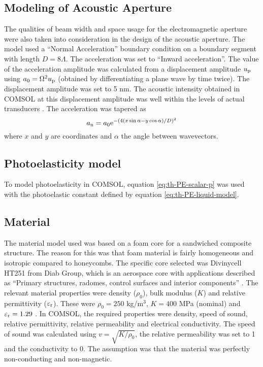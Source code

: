 \documentclass[11pt,twoside]{eitExjobb}
\begin{document}
	\subsection{Modeling of Acoustic Aperture}
	The qualities of beam width and space usage for the electromagnetic aperture were also taken into consideration in the design of the acoustic aperture. The model used a ``Normal Acceleration'' boundary condition on a boundary segment with length $D = 8\Lambda$. The acceleration was set to ``Inward acceleration''. The value of the acceleration amplitude was calculated from a displacement amplitude $u_{\mathrm{p}}$ using $a_0 = \Omega^2 u_{\mathrm{p}}$ (obtained by differentiating a plane wave by time twice). The displacement amplitude was set to 5 nm. The acoustic intensity obtained in COMSOL at this displacement amplitude was well within the levels of actual transducers \cite{Straub2008}. The acceleration was tapered as
	\begin{equation*}
		a_{\mathrm{n}} = a_0 \mathrm{e}^{-(4(x\sin{\alpha} - y\cos{\alpha})/D)^2}
	\end{equation*}
	where $x$ and $y$ are coordinates and $\alpha$ the angle between wavevectors.
	
	\subsection{Photoelasticity model}
	To model photoelasticity in COMSOL, equation \eqref{eq:th-PE-scalar-p} was used with the photoelastic constant defined by equation \eqref{eq:th-PE-liquid-model}.
	
	\subsection{Material}
	The material model used was based on a foam core for a sandwiched composite structure. The reason for this was that foam material is fairly homogeneous and isotropic compared to honeycombs. The specific core selected was Divinycell HT251 from Diab Group, which is an aerospace core with applications described as ``Primary structures, radomes, control surfaces and interior components'' \cite{Diab2016}. The relevant material properties were density ($\rho_0$), bulk modulus ($K$) and relative permittivity ($\varepsilon_{\mathrm{r}}$). These were $\rho_0 = 250$ kg/m$^3$, $K = 400$ MPa (nominal) and $\varepsilon_{\mathrm{r}} = 1.29$ \cite{Diab2016}. In COMSOL, the required properties were density, speed of sound, relative permittivity, relative permeability and electrical conductivity. The speed of sound was calculated using $v = \sqrt{K/\rho_0}$, the relative permeability was set to 1 and the conductivity to 0. The assumption was that the material was perfectly non-conducting and non-magnetic.
	
\end{document}
